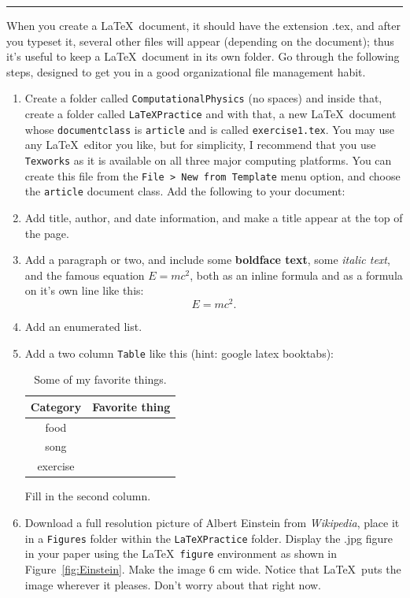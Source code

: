 \rule{\textwidth}{1pt}
\begin{exercise}\label{ex:latexStep1}
When you create a \LaTeX\ document, it should have the extension .tex, and after you typeset it, several other files will appear (depending on the document); thus it's useful to keep a \LaTeX\ document in its own folder. Go through the following steps, designed to get you in a good organizational file management habit.
\begin{enumerate}
	\item Create a folder called \texttt{ComputationalPhysics} (no spaces) and inside that, create a folder called \texttt{LaTeXPractice} and with that, a new \LaTeX\ document whose \texttt{documentclass} is \texttt{article} and is called	\texttt{exercise1.tex}. You may use any \LaTeX\ editor you like, but for simplicity, I recommend that you use \texttt{Texworks} as it is available on all three major computing platforms. You can create this file from the \texttt{File > New from Template} menu option, and choose the \texttt{article} document class. Add the following to your document:
	\item Add title, author, and date information, and make a title appear at the top of the page. 
	\item Add a paragraph or two, and include some \textbf{boldface text}, some \textit{italic text}, and the famous equation 
	$E = m c^2$, both as an inline formula and as a formula on it's own line like this:\\
	$$ E = m c^2. $$
	\item Add an enumerated list.
	\item Add a two column \texttt{Table} like this (hint: google latex booktabs):
	\begin{table}\centering
		\begin{tabular}{c l}\\ \hline
			Category & Favorite thing\\ \hline
			food & \\
			song & \\
			exercise & \\ \hline
		\end{tabular} 
	\caption{Some of my favorite things.}
	\end{table}
    Fill in the second column.
	\item Download a full resolution picture of Albert Einstein from \textit{Wikipedia}, place it in a \texttt{Figures} folder within the \texttt{LaTeXPractice} folder. Display the .jpg figure in your paper using the \LaTeX\ \texttt{figure} environment as shown in Figure~\ref{fig:Einstein}. Make the image 6 cm wide. Notice that \LaTeX\ puts the image wherever it pleases. Don't worry about that right now. 

\end{enumerate}
\end{exercise}
